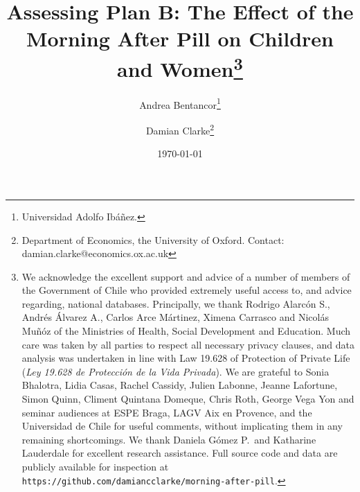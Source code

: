 \documentclass{article}[11pt,subeqn]
\title{Assessing Plan B: The Effect of the Morning After Pill on Children and 
Women\footnote{We acknowledge the excellent support and advice of a number of 
members of the Government of Chile who provided extremely useful access to, and 
advice regarding, national databases.  Principally, we thank Rodrigo Alarc\'on S., 
Andr\'es \'Alvarez A., Carlos Arce M\'artinez, Ximena Carrasco and Nicol\'as 
Mu\~n\'oz of the Ministries of Health, Social Development and Education.  Much 
care was taken by all parties to respect all necessary privacy clauses, and data 
analysis was undertaken in line with Law 19.628 of Protection of Private Life 
(\emph{Ley 19.628 de Protecci\'on de la Vida Privada}).  We are grateful to Sonia 
Bhalotra, Lidia Casas, Rachel Cassidy, Julien Labonne, Jeanne Lafortune, Simon 
Quinn, Climent Quintana Domeque, Chris Roth, George Vega Yon and seminar 
audiences at ESPE Braga, LAGV Aix en Provence, and the Universidad de Chile for 
useful comments, without implicating them in any remaining shortcomings.  We 
thank Daniela G\'omez P.\ and Katharine Lauderdale for excellent research 
assistance.  Full source code and data are publicly available for inspection 
at \texttt{https://github.com/damiancclarke/morning-after-pill}.}}
\author{Andrea Bentancor\thanks{Universidad Adolfo Ib\'a\~nez.} 
\and Damian Clarke\thanks{Department of Economics, the University of Oxford.  
Contact: damian.clarke@economics.ox.ac.uk}}
\date{\today}
\begin{document}
\begin{spacing}{1.4}
\maketitle



\end{spacing}
\end{document}
